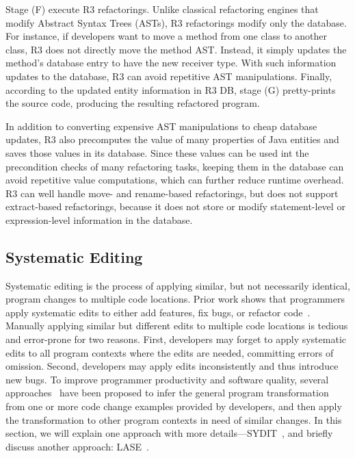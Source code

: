 Stage (F) execute R3 refactorings. Unlike classical refactoring engines that modify Abstract Syntax Trees (ASTs), R3 refactorings modify only the database. For instance, if developers want to move a method from one class to another class, R3 does not directly move the method AST. Instead, it simply updates the method's database entry to have the new receiver type. With such information updates to the database, R3 can avoid repetitive AST manipulations. Finally, according to the updated entity information in R3 DB, stage (G) pretty-prints the source code, producing the resulting refactored program.

In addition to converting expensive AST manipulations to cheap database updates, R3 also precomputes the value of many properties of Java entities and saves those values in its database. Since these values can be used int the precondition checks of many refactoring tasks, keeping them in the database can avoid repetitive value computations, which can further reduce runtime overhead. R3 can well handle move- and rename-based refactorings, but does not support extract-based refactorings, because it does not store or modify statement-level or expression-level information in the database.  

\subsection{Systematic Editing}
\label{sec:sysedit}
Systematic editing is the process of applying similar, but not necessarily identical, program changes to multiple code locations. Prior work shows that programmers apply systematic edits to either add features, fix bugs, or refactor code~\cite{Kim:2005,Kim:2009,Nguyen:2010}. Manually applying similar but different edits to multiple code locations is tedious and error-prone for two reasons. First, developers may forget to apply systematic edits to all program contexts where the edits are needed, committing errors of omission. Second, developers may apply edits inconsistently and thus introduce new bugs. To improve programmer productivity and software quality, several approaches~\cite{MKM2011,MKM2013,Rolim:2017} have been proposed to infer the general program transformation from one or more code change examples provided by developers, and then apply the transformation to other program contexts in need of similar changes. In this section, we will explain one approach with more details---SYDIT~\cite{MKM2011}, and briefly discuss another approach: LASE~\cite{MKM2013}.

